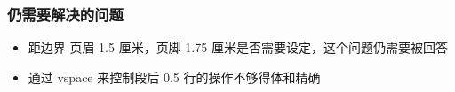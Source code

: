 \documentclass[a4paper]{article}
\begin{document}
{\subsubsection{仍需要解决的问题}
\begin{itemize}
    \item 距边界 页眉 1.5 厘米，页脚 1.75 厘米是否需要设定，这个问题仍需要被回答
    \item 通过 vspace 来控制段后 0.5 行的操作不够得体和精确
\end{itemize}
}

\newpage
{}

\newpage
{}
\end{document}
